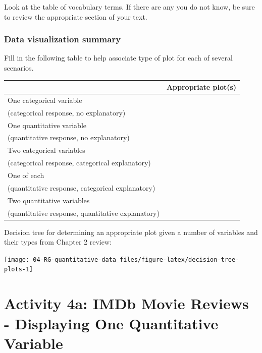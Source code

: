 \documentclass[
]{report}
\newcommand{\rgs}{\vspace{12pt}} %
\begin{document}
Look at the table of vocabulary terms. If there are any you do not know, be sure to review the appropriate section of your text.

\hypertarget{data-visualization-summary}{%
\subsubsection*{Data visualization summary}\label{data-visualization-summary}}

Fill in the following table to help associate type of plot for each of several scenarios.

\begin{center}
\begin{tabular}{|l|p{3in}|} \hline
 & Appropriate plot(s) \\ \hline
One categorical variable & \\
(categorical response, no explanatory) & \\ \hline
One quantitative variable  & \\
(quantitative response, no explanatory) & \\ \hline
Two categorical variables  & \\
(categorical response, categorical explanatory) & \\ \hline
One of each  & \\
(quantitative response, categorical explanatory) & \\ \hline
Two quantitative variables  & \\
(quantitative response, quantitative explanatory) & \\ \hline
\end{tabular}
\end{center}

\rgs

Decision tree for determining an appropriate plot given a number of variables and their types from Chapter 2 review:

\begin{center}\texttt{[image: 04-RG-quantitative-data\_files/figure-latex/decision-tree-plots-1]} \end{center}

\newpage

\hypertarget{activity-4a-imdb-movie-reviews---displaying-one-quantitative-variable}{%
\section{Activity 4a: IMDb Movie Reviews - Displaying One Quantitative Variable}\label{activity-4a-imdb-movie-reviews---displaying-one-quantitative-variable}}
\end{document}
